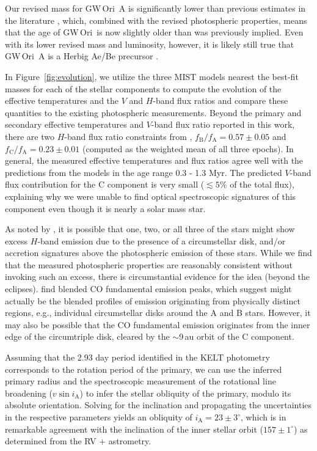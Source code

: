 \documentclass[twocolumn]{aastex61}
\newcommand{\obj}{GW\,Ori}
\begin{document}
Our revised mass for \obj~A is significantly lower than previous estimates in the literature \citep{berger11,fang14}, which, combined with the revised photospheric properties, means that the age of \obj\ is now slightly older than was previously implied. Even with its lower revised mass and luminosity, however, it is likely still true that \obj~A is a Herbig Ae/Be precursor \citep[as noted by][]{fang14}.

In Figure~\ref{fig:evolution}, we utilize the three MIST models nearest the best-fit masses for each of the stellar components to compute the evolution of the effective temperatures and the $V$ and $H$-band flux ratios and compare these quantities to the existing photospheric measurements. Beyond the primary and secondary effective temperatures and $V$-band flux ratio reported in this work, there are two $H$-band flux ratio constraints from \citet{berger11},  $f_\mathrm{B}/f_\mathrm{A} = 0.57 \pm 0.05$ and $f_\mathrm{C}/f_\mathrm{A} = 0.23 \pm 0.01$ (computed as the weighted mean of all three epochs). In general, the measured effective temperatures and flux ratios agree well with the predictions from the models in the age range 0.3 - 1.3 Myr.
The predicted $V$-band flux contribution for the C component is very small ($\lesssim 5\%$ of the total flux), explaining why we were unable to find optical spectroscopic signatures of this component even though it is nearly a solar mass star.

As noted by \citet{berger11}, it is possible that one, two, or all three of the stars might show excess $H$-band emission due to the presence of a circumstellar disk, and/or accretion signatures above the photospheric emission of these stars. While we find that the measured photospheric properties are reasonably consistent without invoking such an excess, there is circumstantial evidence for the idea (beyond the eclipses). \citet{najita03} find blended CO fundamental emission peaks, which \citet{bast11} suggest might actually be the blended profiles of emission originating from physically distinct regions, e.g., individual circumstellar disks around the A and B stars. However, it may also be possible that the CO fundamental emission originates from the inner edge of the circumtriple disk, cleared by the $\sim$9\,au orbit of the C component.

Assuming that the 2.93 day period identified in the KELT photometry corresponds to the rotation period of the primary, we can use the inferred primary radius and the spectroscopic measurement of the rotational line broadening ($v \sin i_\mathrm{A}$) to infer the stellar obliquity of the primary, modulo its absolute orientation. Solving for the inclination and propagating the uncertainties in the respective parameters yields an obliquity of $i_\mathrm{A} = 23 \pm 3^\circ$, which is in remarkable agreement with the inclination of the inner stellar orbit ($157 \pm 1^\circ$) as determined from the RV + astrometry.
\end{document}
